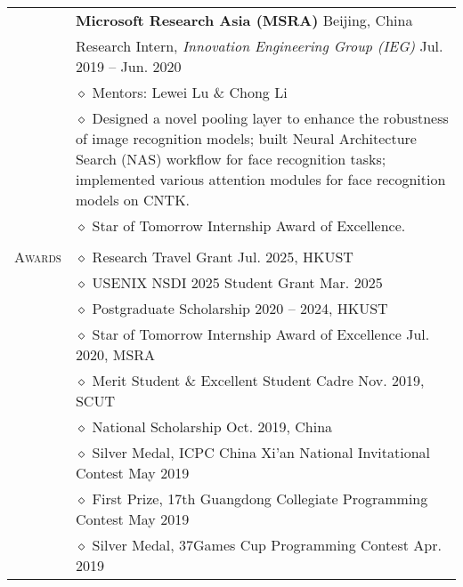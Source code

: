 \documentclass[letterpaper, 12pt]{article}
\begin{document}
\begin{longtable}{p{1.0in}p{5.8in}}
\\

& {\textbf{Microsoft Research Asia (MSRA)}} \hfill Beijing, China\\
& Research Intern, \textit{Innovation Engineering Group (IEG)} \hfill Jul. 2019 -- Jun. 2020 \\
    & $\diamond$ Mentors: Lewei Lu \& Chong Li \\
    & $\diamond$ Designed a novel pooling layer to enhance the robustness of image recognition models; built Neural Architecture Search (NAS) workflow for face recognition tasks; implemented various attention modules for face recognition models on CNTK. \\
    & $\diamond$ Star of Tomorrow Internship Award of Excellence. \\

& \\


\nohyphens{\textsc{Awards}}
& $\diamond$ Research Travel Grant \hfill Jul. 2025, HKUST \\

& $\diamond$ USENIX NSDI 2025 Student Grant \hfill Mar. 2025 \\

& $\diamond$ Postgraduate Scholarship \hfill 2020 -- 2024, HKUST \\
& $\diamond$ Star of Tomorrow Internship Award of Excellence \hfill Jul. 2020, MSRA \\

& $\diamond$ Merit Student \& Excellent Student Cadre \hfill Nov. 2019, SCUT \\
& $\diamond$ National Scholarship \hfill Oct. 2019, China \\

& $\diamond$ Silver Medal, ICPC China Xi'an National Invitational Contest \hfill May 2019 \\

& $\diamond$ First Prize, 17th Guangdong Collegiate Programming Contest \hfill May 2019 \\

& $\diamond$ Silver Medal, 37Games Cup Programming Contest \hfill Apr. 2019 \\


\end{longtable}
\end{document}
